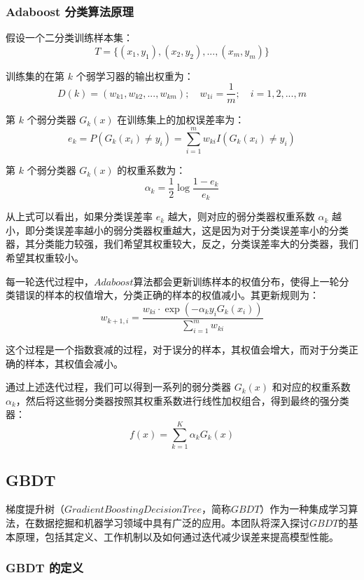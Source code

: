 \documentclass[withoutpreface,bwprint]{cumcmthesis}
\begin{document}
\subsubsection{Adaboost 分类算法原理}

假设一个二分类训练样本集：
\[ T = \{(x_1, y_1), (x_2, y_2), ..., (x_m, y_m)\} \]

训练集的在第 \( k \) 个弱学习器的输出权重为：
\[ D(k) = (w_{k1}, w_{k2}, ..., w_{km});\quad w_{1i} = \frac{1}{m};\quad i = 1, 2, ..., m \]

第 \( k \) 个弱分类器 \( G_k(x) \) 在训练集上的加权误差率为：
\[ e_k = P(G_k(x_i) \neq y_i) = \sum_{i=1}^m w_{ki} I(G_k(x_i) \neq y_i) \]

第 \( k \) 个弱分类器 \( G_k(x) \) 的权重系数为：
\[ \alpha_k = \frac{1}{2} \log \frac{1 - e_k}{e_k} \]


从上式可以看出，如果分类误差率 \( e_k \) 越大，则对应的弱分类器权重系数 \( \alpha_k\) 越小，即分类误差率越小的弱分类器权重越大，这是因为对于分类误差率小的分类器，其分类能力较强，我们希望其权重较大，反之，分类误差率大的分类器，我们希望其权重较小。

每一轮迭代过程中，\(Adaboost\)算法都会更新训练样本的权值分布，使得上一轮分类错误的样本的权值增大，分类正确的样本的权值减小。其更新规则为：
\[ w_{k+1,i} = \frac{w_{ki} \cdot \exp(-\alpha_k y_i G_k(x_i))}{\sum_{i=1}^m w_{ki}} \]

这个过程是一个指数衰减的过程，对于误分的样本，其权值会增大，而对于分类正确的样本，其权值会减小。

通过上述迭代过程，我们可以得到一系列的弱分类器 \( G_k(x) \) 和对应的权重系数 \( \alpha_k \)，然后将这些弱分类器按照其权重系数进行线性加权组合，得到最终的强分类器：
\[ f(x) = \sum_{k=1}^K \alpha_k G_k(x) \]


\subsection{GBDT}

梯度提升树（\(Gradient Boosting Decision Tree\)，简称\(GBDT\)）作为一种集成学习算法，在数据挖掘和机器学习领域中具有广泛的应用。本团队将深入探讨\(GBDT\)的基本原理，包括其定义、工作机制以及如何通过迭代减少误差来提高模型性能。

\subsubsection{GBDT 的定义}
\end{document}
